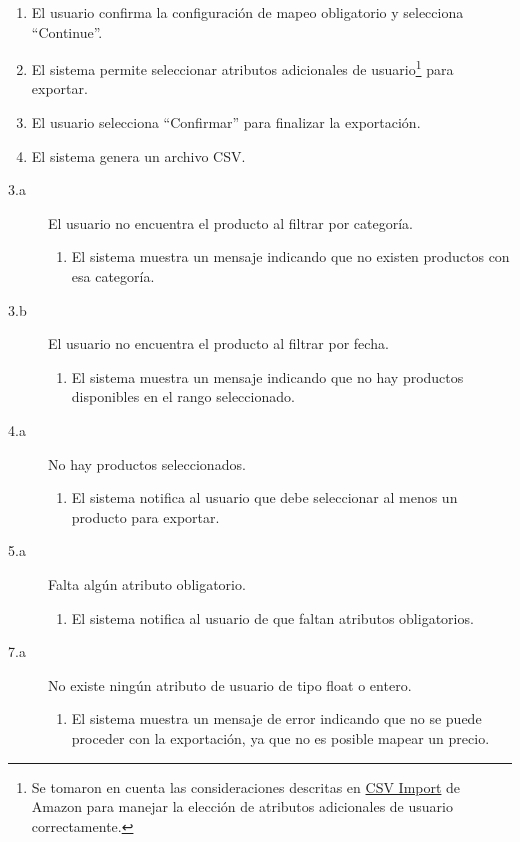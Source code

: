 \begin{enumerate}
    \item El usuario confirma la configuración de mapeo obligatorio y selecciona \enquote{Continue}.
    \item El sistema permite seleccionar atributos adicionales de usuario\footnote{Se tomaron en cuenta las consideraciones descritas en \href{https://buywithprime.amazon.com/knowledge-center/csv-import?utm_medium=website\&utm_source=direct\#standalone-product}{CSV Import} de Amazon para manejar la elección de atributos adicionales de usuario correctamente.} para exportar.
    \item El usuario selecciona \enquote{Confirmar} para finalizar la exportación.
    \item El sistema genera un archivo CSV.
\end{enumerate}

\begin{description}
    \item[3.a] El usuario no encuentra el producto al filtrar por categoría.
    \begin{enumerate}
        \item[3.a.1] El sistema muestra un mensaje indicando que no existen productos con esa categoría.
    \end{enumerate}
    \item[3.b] El usuario no encuentra el producto al filtrar por fecha.
    \begin{enumerate}
        \item[3.b.1] El sistema muestra un mensaje indicando que no hay productos disponibles en el rango seleccionado.
    \end{enumerate}
    \item[4.a] No hay productos seleccionados.
    \begin{enumerate}
        \item[4.a.1] El sistema notifica al usuario que debe seleccionar al menos un producto para exportar.
    \end{enumerate}
    \item[5.a] Falta algún atributo obligatorio.
    \begin{enumerate}
        \item[5.a.1] El sistema notifica al usuario de que faltan atributos obligatorios.
    \end{enumerate}
    \item[7.a] No existe ningún atributo de usuario de tipo float o entero.
    \begin{enumerate}
        \item[7.a.1] El sistema muestra un mensaje de error indicando que no se puede proceder con la exportación, ya que no es posible mapear un precio.
    \end{enumerate}
\end{description}


